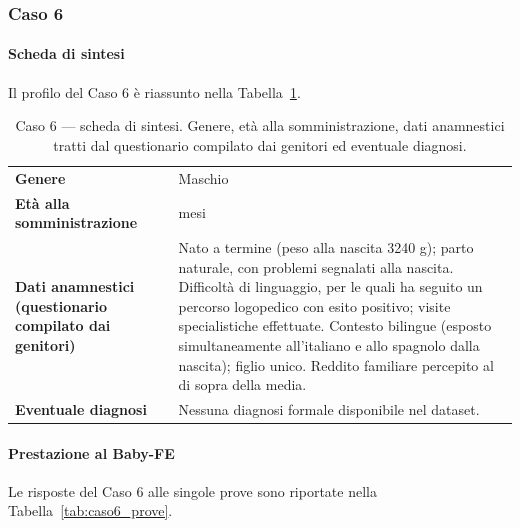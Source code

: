  \subsubsection*{Caso 6}

 \paragraph*{Scheda di sintesi}

Il profilo del Caso 6 è riassunto nella Tabella~\ref{tab:caso6_scheda}.

\begin{table}[htbp]
\centering
\caption[Caso 6 --- scheda di sintesi]{Caso 6 --- scheda di sintesi. Genere, età alla somministrazione, dati anamnestici tratti dal questionario compilato dai genitori ed eventuale diagnosi.}
\label{tab:caso6_scheda}
\begin{tabular}{|>{\raggedright\arraybackslash}p{4.3cm}|>{\raggedright\arraybackslash}p{9.2cm}|}
\toprule
\textbf{Genere} & Maschio \\
\textbf{Età alla somministrazione} & 28 mesi \\
\textbf{Dati anamnestici (questionario compilato dai genitori)} & Nato a termine (peso alla nascita 3240 g); parto naturale, con problemi segnalati alla nascita. Difficoltà di linguaggio, per le quali ha seguito un percorso logopedico con esito positivo; visite specialistiche effettuate. Contesto bilingue (esposto simultaneamente all'italiano e allo spagnolo dalla nascita); figlio unico. Reddito familiare percepito al di sopra della media. \\
\textbf{Eventuale diagnosi} & Nessuna diagnosi formale disponibile nel dataset. \\
\bottomrule
\end{tabular}
\end{table}

 \paragraph*{Prestazione al Baby-FE}

Le risposte del Caso 6 alle singole prove sono riportate nella Tabella~\ref{tab:caso6_prove}.

